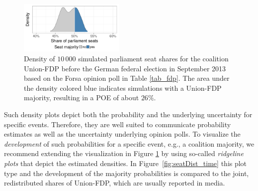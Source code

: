 \documentclass[smallcondensed]{svjour3}     %
\begin{document}
\begin{figure}[H]\centering
\includegraphics[width=0.45\textwidth]{figures/2013_forsa_cdufdp_lastPreelectionPoll.pdf}
\caption{Density of $10\,000$ simulated parliament seat shares for the coalition
Union-FDP before the German federal election in September 2013 based on the Forsa
opinion poll in Table \ref{tab_fdp}. The area under the density colored blue
indicates simulations with a Union-FDP majority, resulting in a
POE of about $26\%$.
\label{fig:seatDist}
}
\end{figure}

Such density plots depict both the probability and the underlying
uncertainty for specific events. Therefore, they are well suited to communicate
probability estimates as well as the uncertainty underlying opinion polls.
To visualize the {\it development} of such probabilities
for a specific event, e.g., a coalition majority, we recommend extending the
visualization in Figure \ref{fig:seatDist} by using so-called
\emph{ridgeline plots} \citep{wilke_2017} that depict the estimated densities.
In Figure~\ref{fig:seatDist_time} this plot type and the development of the majority
probabilities is compared to the joint, redistributed shares of Union-FDP, which
are usually reported in media.
\end{document}

